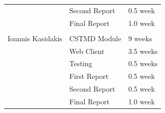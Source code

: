 \documentclass[a4paper,11pt]{article}
\begin{document}
\begin{table}[h]
\begin{tabular}{|l|l|l|}
&  Second Report&  0.5 week  \\ \cline{1-3}
&  Final Report&  1.0 week  \\ \cline{1-3}
&  &   \\ \cline{1-3}
Ioannis Kasidakis& CSTMD Module& 9 weeks  \\ \cline{1-3}
&  Web Client & 3.5 weeks    \\ \cline{1-3}
& Testing& 0.5 weeks \\ \cline{1-3}
&  First Report& 0.5 week     \\ \cline{1-3}
&  Second Report& 0.5 week   \\ \cline{1-3}
&  Final Report& 1.0 week   \\ \cline{1-3}

\end{tabular}
\end{table}
\end{document}
